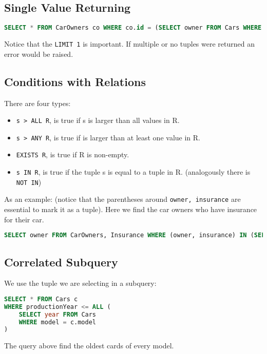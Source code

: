 \documentclass{article}
\renewcommand{\t}[1]{\texttt{#1}}
\begin{document}
\subsection*{Single Value Returning}
\begin{lstlisting}[language=SQL]
SELECT * FROM CarOwners co WHERE co.id = (SELECT owner FROM Cars WHERE numberPlate = 123 LIMIT 1)
\end{lstlisting}
Notice that the \t{LIMIT 1} is important. If multiple or no tuples were returned an error would be raised.

\subsection*{Conditions with Relations}

There are four types:

\begin{itemize}
	\item \t{s > ALL R}, is true if s is larger than all values in R.
	\item \t{s > ANY R}, is true if is larger than at least one value in R.
	\item \t{EXISTS R}, is true if R is non-empty.
	\item \t{s IN R}, is true if the tuple s is equal to a tuple in R. (analogously there is \t{NOT IN})
\end{itemize}

As an example: (notice that the parentheses around \t{owner, insurance} are essential to mark it as a tuple). Here we find the car owners who have insurance for their car.
\begin{lstlisting}[language=SQL]
SELECT owner FROM CarOwners, Insurance WHERE (owner, insurance) IN (SELECT owner, insurance FROM OwnerInsurance)
\end{lstlisting}

\subsection*{Correlated Subquery}

We use the tuple we are selecting in a subquery:

\begin{lstlisting}[language=SQL]
SELECT * FROM Cars c
WHERE productionYear <= ALL (
	SELECT year FROM Cars 
	WHERE model = c.model
) 
\end{lstlisting}

The query above find the oldest cards of every model.
\end{document}
